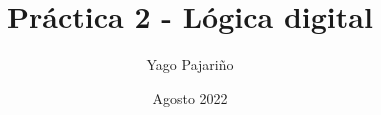 
\setlength{\parindent}{0pt}

\title{Práctica 2 - Lógica digital}
\author{Yago Pajariño}
\date{Agosto 2022}



\maketitle






